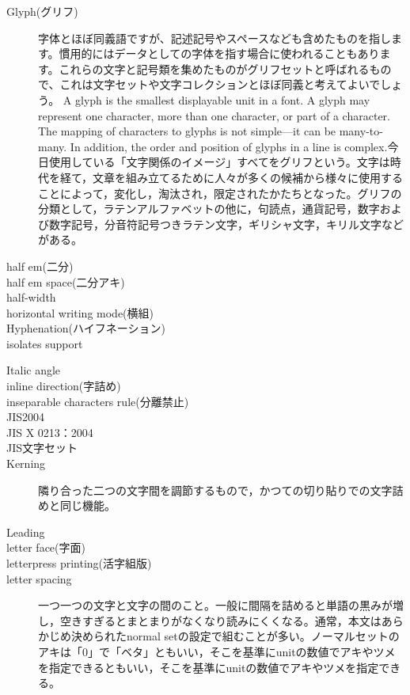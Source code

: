 \begin{description}
    \item[Glyph(グリフ)]字体とほぼ同義語ですが、記述記号やスペースなども含めたものを指します。慣用的にはデータとしての字体を指す場合に使われることもあります。これらの文字と記号類を集めたものがグリフセットと呼ばれるもので、これは文字セットや文字コレクションとほぼ同義と考えてよいでしょう。 A glyph is the smallest displayable unit in a font. A glyph may represent one character, more than one character, or part of a character. The mapping of characters to glyphs is not simple—it can be many-to-many. In addition, the order and position of glyphs in a line is complex\cite{developer.apple.com:library/archive/documentation/MacOSX/Conceptual/BPInternational/InternationalizingYourCode/InternationalizingYourCode.html}.今日使用している「文字関係のイメージ」すべてをグリフという。文字は時代を経て，文章を組み立てるために人々が多くの候補から様々に使用することによって，変化し，淘汰され，限定されたかたちとなった。グリフの分類として，ラテンアルファベットの他に，句読点，通貨記号，数字および数字記号，分音符記号つきラテン文字，ギリシャ文字，キリル文字などがある\cite{handbook_of_typography}。
    \item[half em(二分)]
    \item[half em space(二分アキ)]
    \item[half-width]
    \item[horizontal writing mode(横組)]
    \item[Hyphenation(ハイフネーション)]
    \item[isolates support]\cite{developer.apple.com:videos/play/wwdc2016/232/}
    \item[Italic angle]
    \item[inline direction(字詰め)]
    \item[inseparable characters rule(分離禁止)]
    \item[JIS2004]
    \item[JIS X 0213：2004]
    \item[JIS文字セット]
    \item[Kerning]隣り合った二つの文字間を調節するもので，かつての切り貼りでの文字詰めと同じ機能\cite{handbook_of_typography}。
    \item[Leading]
    \item[letter face(字面)]
    \item[letterpress printing(活字組版)]
    \item[letter spacing]一つ一つの文字と文字の間のこと。一般に間隔を詰めると単語の黒みが増し，空きすぎるとまとまりがなくなり読みにくくなる。通常，本文はあらかじめ決められたnormal setの設定で組むことが多い。ノーマルセットのアキは「0」で「ベタ」ともいい，そこを基準にunitの数値でアキやツメを指定できるともいい，そこを基準にunitの数値でアキやツメを指定できる\cite{handbook_of_typography}。

\end{description}
